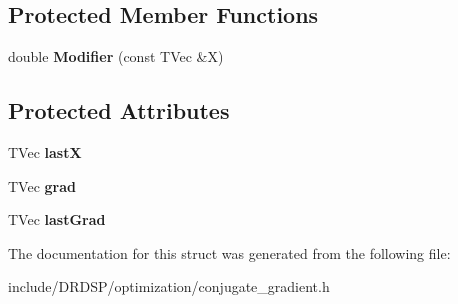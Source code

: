 \subsection*{Protected Member Functions}
\begin{DoxyCompactItemize}
\item 
\hypertarget{struct_d_r_d_s_p_1_1_conjugate_gradient_acc4e30524771b760397e6482e6329ab6}{double {\bfseries Modifier} (const T\-Vec \&X)}\label{struct_d_r_d_s_p_1_1_conjugate_gradient_acc4e30524771b760397e6482e6329ab6}

\end{DoxyCompactItemize}
\subsection*{Protected Attributes}
\begin{DoxyCompactItemize}
\item 
\hypertarget{struct_d_r_d_s_p_1_1_conjugate_gradient_a362449a6e569de46840a7410559bed88}{T\-Vec {\bfseries last\-X}}\label{struct_d_r_d_s_p_1_1_conjugate_gradient_a362449a6e569de46840a7410559bed88}

\item 
\hypertarget{struct_d_r_d_s_p_1_1_conjugate_gradient_a19f6741b92470cadd583f9d8bf466e59}{T\-Vec {\bfseries grad}}\label{struct_d_r_d_s_p_1_1_conjugate_gradient_a19f6741b92470cadd583f9d8bf466e59}

\item 
\hypertarget{struct_d_r_d_s_p_1_1_conjugate_gradient_a1ddf7ca33ebe6aa69443b0de2a55b7d3}{T\-Vec {\bfseries last\-Grad}}\label{struct_d_r_d_s_p_1_1_conjugate_gradient_a1ddf7ca33ebe6aa69443b0de2a55b7d3}

\end{DoxyCompactItemize}


The documentation for this struct was generated from the following file\-:\begin{DoxyCompactItemize}
\item 
include/\-D\-R\-D\-S\-P/optimization/conjugate\-\_\-gradient.\-h\end{DoxyCompactItemize}
